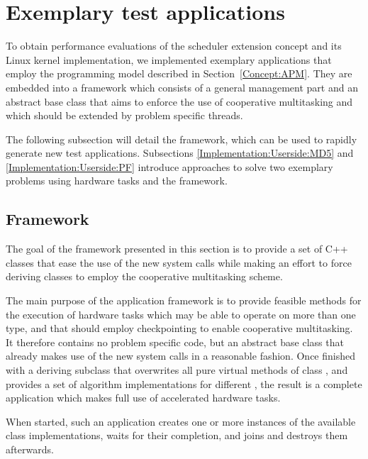 \section{Exemplary test applications}
\label{Implementation}
	\label{Implementation:Userside}
To obtain performance evaluations of the scheduler extension concept and its Linux kernel implementation, we implemented exemplary applications that employ the programming model described in Section~\ref{Concept:APM}. They are embedded into a framework which consists of a general management part and an abstract base class that aims to enforce the use of cooperative multitasking and which should be extended by problem specific threads.

The following subsection will detail the framework, which can be used to rapidly generate new test applications. Subsections \ref{Implementation:Userside:MD5} and \ref{Implementation:Userside:PF} introduce approaches to solve two exemplary problems using hardware tasks and the framework.

\subsection{Framework}
\label{Implementation:Userside:Framework}
The goal of the framework presented in this section is to provide a set of C++ classes that ease the use of the new system calls while making an effort to force deriving classes to employ the cooperative multitasking scheme.

The main purpose of the application framework is to provide feasible methods for the execution of hardware tasks which may be able to operate on more than one \cu{} type, and that should employ checkpointing to enable cooperative multitasking. It therefore contains no problem specific code, but an abstract base class  that already makes use of the new system calls in a reasonable fashion. Once finished with a deriving subclass that overwrites all pure virtual methods of class , and provides a set of algorithm implementations for different \cus{}, the result is a complete application which makes full use of accelerated hardware tasks.

When started, such an application creates one or more instances of the available  class implementations, waits for their completion, and joins and destroys them afterwards.

